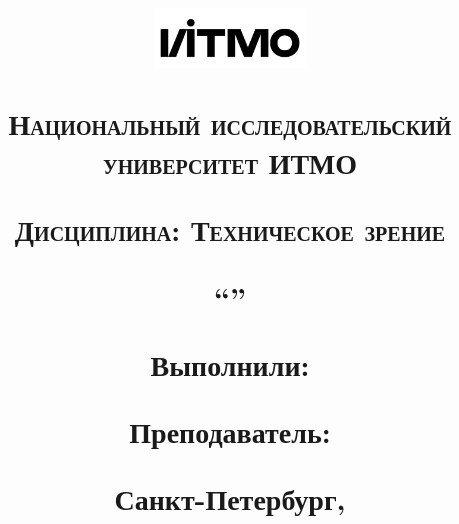\begin{titlepage}

\thispagestyle{empty}

\title{

\includegraphics[width=4cm]{media/ITMO_logo.png} 

\vspace{1em}
\begin{center}
\large\textsc{\textbf{Национальный исследовательский университет ИТМО}}
\vspace{1em}
\end{center}

\begin{center}
\large\textsc{\textbf{Дисциплина: Техническое зрение}}
\vspace{1em}
\end{center}

\begin{center}
\large\textsc{\textbf{\name}}

\vspace{1em}
``\subname'' 

\end{center}

\vspace{3em}

\begin{flushright}
\normalsize{ 
Выполнили: \\ \textbf{\madeby} 

Преподаватель: \\ \textbf{\teacher} 
}
\end{flushright}	

\vfill


\begin{center}
\small{Санкт-Петербург, \the\year}
\end{center}
}


\author{}
\date{}
\maketitle
\thispagestyle{empty}
\end{titlepage}
